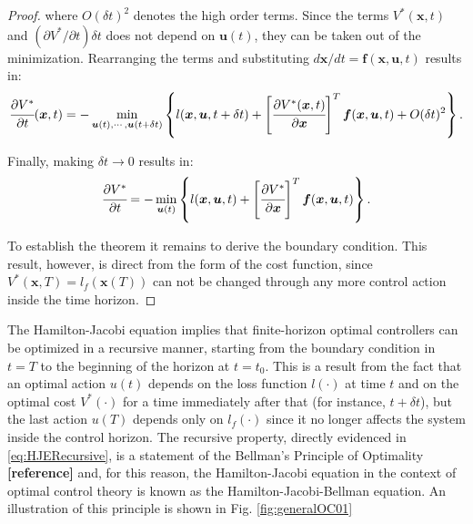 \documentclass[a4paper,11pt]{book}
\numberwithin{figure}{chapter}
\numberwithin{equation}{chapter}
\numberwithin{table}{chapter}
\theoremstyle{definition}
\begin{document}
\begin{proof}
    \noindent where $O(\delta t)^2$ denotes the high order terms. Since the terms $V^*(\bm{x}, t)$ and $(\partial V^*/\partial t) \delta t$ does not depend on $\bm{u}(t)$, they can be taken out of the minimization. Rearranging the terms and substituting $d \bm{x} / dt = \bm{f}(\bm{x}, \bm{u}, t)$ results in:
    \begin{equation}
        \cfrac{\partial V^*}{\partial t}(\bm{x}, t) =  - \min_{\bm{u}(t), \cdots, \bm{u}(t+\delta t)} \left\{ l(\bm{x}, \bm{u}, t + \delta t)  + \left[ \cfrac{\partial V^*(\bm{x}, t)}{\partial \bm{x}} \right]^T \bm{f}(\bm{x}, \bm{u}, t) + O(\delta t)^2  \right\}
    .\end{equation}
    
    Finally, making $\delta t \to 0$ results in:
    \begin{equation}
        \cfrac{\partial V^*}{\partial t} =  - \min_{\bm{u}(t)} \left\{ l(\bm{x}, \bm{u}, t)  + \left[ \cfrac{\partial V^*}{\partial \bm{x}} \right]^T \bm{f}(\bm{x}, \bm{u}, t) \right\}
    .\end{equation}
    
    To establish the theorem it remains to derive the boundary condition. This result, however, is direct from the form of the cost function, since $V^*(\bm{x}, T) = l_f(\bm{x}(T))$ can not be changed through any more control action inside the time horizon.
\end{proof}

The Hamilton-Jacobi equation implies that finite-horizon optimal controllers can be optimized in a recursive manner, starting from the boundary condition in $t = T$ to the beginning of the horizon at $t = t_0$. This is a result from the fact that an optimal action $u(t)$ depends on the loss function $l(\cdot)$ at time $t$ and on the optimal cost $V^*(\cdot)$ for a time immediately after that (for instance, $t+\delta t$), but the last action $u(T)$ depends only on $l_f(\cdot)$ since it no longer affects the system inside the control horizon. The recursive property, directly evidenced in \eqref{eq:HJERecursive}, is a statement of the Bellman's Principle of Optimality \textbf{[reference]} and, for this reason, the Hamilton-Jacobi equation in the context of optimal control theory is known as the Hamilton-Jacobi-Bellman equation. An illustration of this principle is shown in Fig. \ref{fig:generalOC01}
\end{document}
